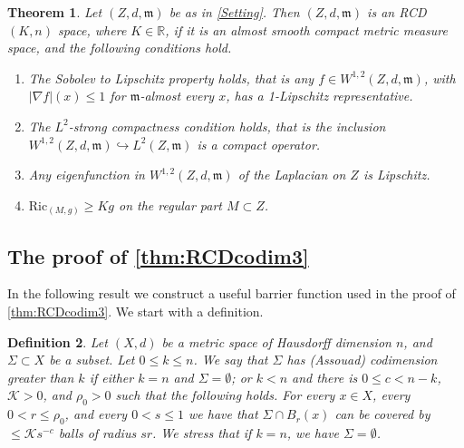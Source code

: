 \documentclass[12pt,a4paper,reqno]{amsart}
\newtheorem{theorem}{Theorem}[section]
\newtheorem{definition}[theorem]{Definition}
\renewcommand{\leq}{\leqslant}
\renewcommand{\geq}{\geqslant}
\begin{document}
\begin{theorem}\label{thm:ToRCD}
Let $(Z,d,\mathfrak{m})$ be as in \cref{Setting}. Then $(Z,d,\mathfrak{m})$ is an \textit{RCD}$(K, n)$ space, where $K \in \mathbb{R}$, if it is an almost smooth compact metric measure space, and the following conditions hold.
\begin{enumerate}
    \item The Sobolev to Lipschitz property holds, that is any $f \in W^{1,2}(Z,d,\mathfrak{m})$, with $|\nabla f|(x) \leq 1$ for $\mathfrak{m}$-almost every $x$, has a 1-Lipschitz representative.
    \item The $L^2$-strong compactness condition holds, that is the inclusion $W^{1,2}(Z,d,\mathfrak{m}) \hookrightarrow L^2(Z,\mathfrak{m})$ is a compact operator.
    \item Any eigenfunction in $W^{1,2}(Z,d,\mathfrak{m})$ of the Laplacian on $Z$ is Lipschitz.
    \item $\mathrm{Ric}_{(M,g)} \geq Kg$ on the regular part $M\subset Z$.
\end{enumerate}
\end{theorem}

\subsection{The proof of \texorpdfstring{\cref{thm:RCDcodim3}}{Theorem 1.1}}

In the following result we construct a useful barrier function used in the proof of \cref{thm:RCDcodim3}. We start with a definition.
\begin{definition}\label{def:Codimension}
    Let $(X,d)$ be a metric space of Hausdorff dimension $n$, and $\Sigma\subset X$ be a subset. Let $0\leq k\leq n$. We say that $\Sigma$ {\rm has 
    (Assouad)
    codimension greater than $k$} if either $k=n$ and $\Sigma=\emptyset$; or $k<n$ and there is $0\leq c<n-k$, $\mathcal{K} > 0$, and $\rho_0>0$ such that the following holds. For every $x\in X$, every $0<r\leq \rho_0$, and every $0<s\leq 1$ we have that $\Sigma\cap B_r(x)$ can be covered by $\leq \mathcal{K} s^{-c}$ balls of radius $sr$. We stress that if $k=n$, we have $\Sigma=\emptyset$.
\end{definition}
 
\end{document}
